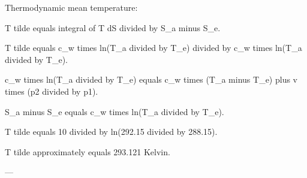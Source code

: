 Thermodynamic mean temperature:  

T tilde equals integral of T dS divided by S_a minus S_e.  

T tilde equals c_w times ln(T_a divided by T_e) divided by c_w times ln(T_a divided by T_e).  

c_w times ln(T_a divided by T_e) equals c_w times (T_a minus T_e) plus v times (p2 divided by p1).  

S_a minus S_e equals c_w times ln(T_a divided by T_e).  

T tilde equals 10 divided by ln(292.15 divided by 288.15).  

T tilde approximately equals 293.121 Kelvin.  

---